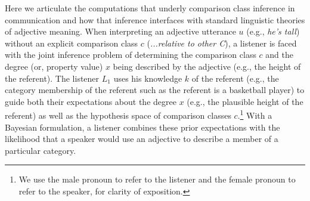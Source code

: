 \documentclass[doc, floatsintext]{apa6}
\begin{document}
Here we articulate the computations that underly comparison class inference in communication and how that inference interfaces with standard linguistic theories of adjective meaning.
When interpreting an adjective utterance $u$  (e.g., \emph{he's tall}) without an explicit comparison class $c$ (\emph{...relative to other C}), a listener is faced with the joint inference problem of determining the comparison class $c$  and the degree (or, property value) $x$  being described by the adjective (e.g., the height of the referent).
The listener $L_1$  uses his knowledge $k$ of the referent (e.g., the category membership of the referent such as the referent is a basketball player) to guide both their expectations about the degree $x$ (e.g., the plausible height of the referent) as well as the hypothesis space of comparison classes $c$.\footnote{We use the male pronoun to refer to the listener and the female pronoun to refer to the speaker, for clarity of exposition.}
With a Bayesian formulation, a listener combines these prior expectations with the likelihood that a speaker would use an adjective to describe a member of a particular category.



\end{document}
